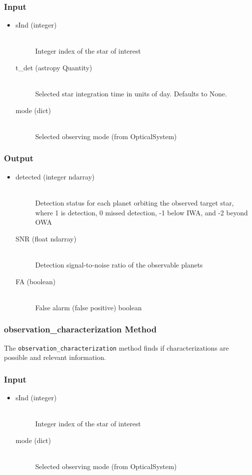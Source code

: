 \documentclass[cleanfoot]{asme2ej}
\begin{document}
\subsubsection*{Input}
\begin{itemize}
\item
\begin{description}
    \item[sInd (integer)] \hfill \\ Integer index of the star of interest
    \item[t\_det (astropy Quantity)] \hfill \\ Selected star integration time in units of day. Defaults to None.
    \item[mode (dict)] \hfill \\ Selected observing mode (from OpticalSystem)
\end{description}
\end{itemize}

\subsubsection*{Output}
\begin{itemize}
\item 
\begin{description}
    \item[detected (integer ndarray)] \hfill \\ Detection status for each planet orbiting the observed target star, where 1 is detection, 0 missed detection, -1 below IWA, and -2 beyond OWA
    \item[SNR (float ndarray)] \hfill \\ Detection signal-to-noise ratio of the observable planets
    \item[FA (boolean)] \hfill \\ False alarm (false positive) boolean
\end{description}
\end{itemize}

\subsubsection{observation\_characterization Method} \label{sec:observationcharacterizationtask}
The \verb+observation_characterization+ method finds if characterizations are possible and relevant information.

\subsubsection*{Input}
\begin{itemize}
\item
\begin{description}
    \item[sInd (integer)] \hfill \\ Integer index of the star of interest
    \item[mode (dict)] \hfill \\ Selected observing mode (from OpticalSystem)
\end{description}
\end{itemize}
\end{document}
